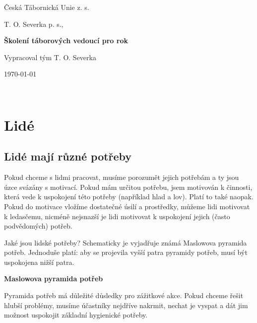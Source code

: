 \documentclass[a4paper,12pt]{report}
\begin{document}
\author{Daniel Adámek}
\begin{titlepage}

\mainpagelogo

\centering 
        \Large{Česká Tábornická Unie z. s.}
        \vspace{0.5cm}
        
        \Large{T. O. Severka p. s.,}
        \vspace{7.5cm}
        
        \Huge
        \textbf{Školení táborových vedoucí pro rok \the\year{}}
            
        \vspace{1.5cm}
            
        \large{Vypracoval tým T. O. Severka}
            
        \vfill
        \today

        \vspace{0.8cm}
\end{titlepage}

\pagebreak

\newpage

\

\newpage

\tableofcontents
\pagelogos
\pagebreak

\chapter{Lidé}\pagelogos
\section{Lidé mají různé potřeby}
Pokud chceme s lidmi pracovat, musíme porozumět jejich potřebám a ty jsou úzce svázány s motivací. Pokud mám určitou potřebu, jsem motivován k činnosti, která vede k uspokojení této potřeby (například hlad a lov). Platí to také naopak.
Pokud do motivace vložíme dostatečné úsilí a prostředky, můžeme lidi motivovat k ledasčemu, nicméně nejsnazší je lidi motivovat k uspokojení jejich (často podvědomých) potřeb.

Jaké jsou lidské potřeby? Schematicky je vyjadřuje známá Maslowova pyramida potřeb. Jednoduše platí: aby se projevila vyšší patra pyramidy potřeb, musí být uspokojena nižší patra.

\begin{flushleft}
\textbf{Maslowova pyramida potřeb}
\end{flushleft}
Pyramida potřeb má důležité důsledky pro zážitkové akce. Pokud chceme řešit hlubší problémy, musíme účastníky nejdříve nakrmit, nechat je vyspat a dát jim možnost uspokojit základní hygienické potřeby.
\end{document}
